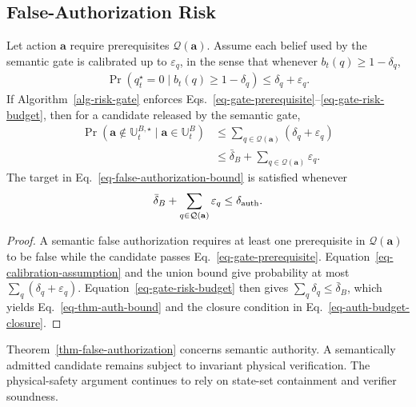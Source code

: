 \subsection{False-Authorization Risk}
\begin{theorem}
\label{thm-false-authorization}
Let action $\mathbf{a}$ require prerequisites $\mathcal{Q}(\mathbf{a})$. Assume each belief used by the semantic gate is calibrated up to $\varepsilon_q$, in the sense that whenever $b_t(q)\ge1-\delta_q$,
\begin{align}
\label{eq-calibration-assumption}
\Pr(q_t^\star=0\mid b_t(q)\ge1-\delta_q)
\le\delta_q+\varepsilon_q.
\end{align}
If Algorithm~\ref{alg-risk-gate} enforces Eqs.~\ref{eq-gate-prerequisite}--\ref{eq-gate-risk-budget}, then for a candidate released by the semantic gate,
\begin{align}
\label{eq-thm-auth-bound}
\Pr\!\left(\mathbf{a}\notin\mathbb U_t^{B,\star}
\mid \mathbf{a}\in\mathbb U_t^B\right)
&\le \sum_{q\in\mathcal{Q}(\mathbf{a})}(\delta_q+\varepsilon_q)\nonumber\\
&\le\bar\delta_B+\sum_{q\in\mathcal{Q}(\mathbf{a})}\varepsilon_q.
\end{align}
The target in Eq.~\ref{eq-false-authorization-bound} is satisfied whenever
\begin{align}
\label{eq-auth-budget-closure}
\bar\delta_B+\sum_{q\in\mathcal{Q}(\mathbf{a})}\varepsilon_q
\le\delta_{\rm auth}.
\end{align}
\end{theorem}

\begin{proof}
A semantic false authorization requires at least one prerequisite in $\mathcal{Q}(\mathbf{a})$ to be false while the candidate passes Eq.~\ref{eq-gate-prerequisite}. Equation~\ref{eq-calibration-assumption} and the union bound give probability at most $\sum_q(\delta_q+\varepsilon_q)$. Equation~\ref{eq-gate-risk-budget} then gives $\sum_q\delta_q\le\bar\delta_B$, which yields Eq.~\ref{eq-thm-auth-bound} and the closure condition in Eq.~\ref{eq-auth-budget-closure}.
\end{proof}

Theorem~\ref{thm-false-authorization} concerns semantic authority. A semantically admitted candidate remains subject to invariant physical verification. The physical-safety argument continues to rely on state-set containment and verifier soundness.

